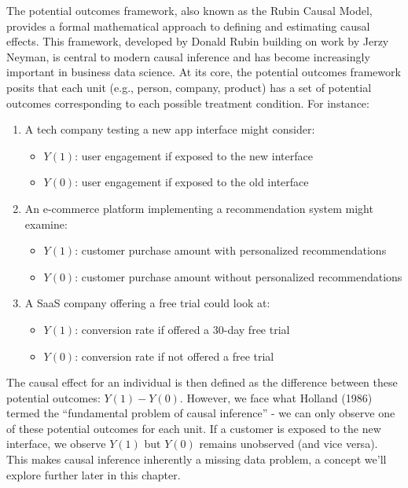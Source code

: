 \documentclass[
  letterpaper,
  DIV=11,
  numbers=noendperiod]{scrreprt}
\providecommand{\tightlist}{%
  \setlength{\itemsep}{0pt}\setlength{\parskip}{0pt}}\usepackage{longtable,booktabs,array}
\begin{document}
The potential outcomes framework, also known as the Rubin Causal Model,
provides a formal mathematical approach to defining and estimating
causal effects. This framework, developed by Donald Rubin building on
work by Jerzy Neyman, is central to modern causal inference and has
become increasingly important in business data science. At its core, the
potential outcomes framework posits that each unit (e.g., person,
company, product) has a set of potential outcomes corresponding to each
possible treatment condition. For instance:

\begin{enumerate}
\def\labelenumi{\arabic{enumi}.}
\tightlist
\item
  A tech company testing a new app interface might consider:

  \begin{itemize}
  \tightlist
  \item
    \(Y(1)\): user engagement if exposed to the new interface
  \item
    \(Y(0)\): user engagement if exposed to the old interface
  \end{itemize}
\item
  An e-commerce platform implementing a recommendation system might
  examine:

  \begin{itemize}
  \tightlist
  \item
    \(Y(1)\): customer purchase amount with personalized recommendations
  \item
    \(Y(0)\): customer purchase amount without personalized
    recommendations
  \end{itemize}
\item
  A SaaS company offering a free trial could look at:

  \begin{itemize}
  \tightlist
  \item
    \(Y(1)\): conversion rate if offered a 30-day free trial
  \item
    \(Y(0)\): conversion rate if not offered a free trial
  \end{itemize}
\end{enumerate}

The causal effect for an individual is then defined as the difference
between these potential outcomes: \(Y(1) - Y(0)\). However, we face what
Holland (1986) termed the ``fundamental problem of causal inference'' -
we can only observe one of these potential outcomes for each unit. If a
customer is exposed to the new interface, we observe \(Y(1)\) but
\(Y(0)\) remains unobserved (and vice versa). This makes causal
inference inherently a missing data problem, a concept we'll explore
further later in this chapter.
\end{document}
